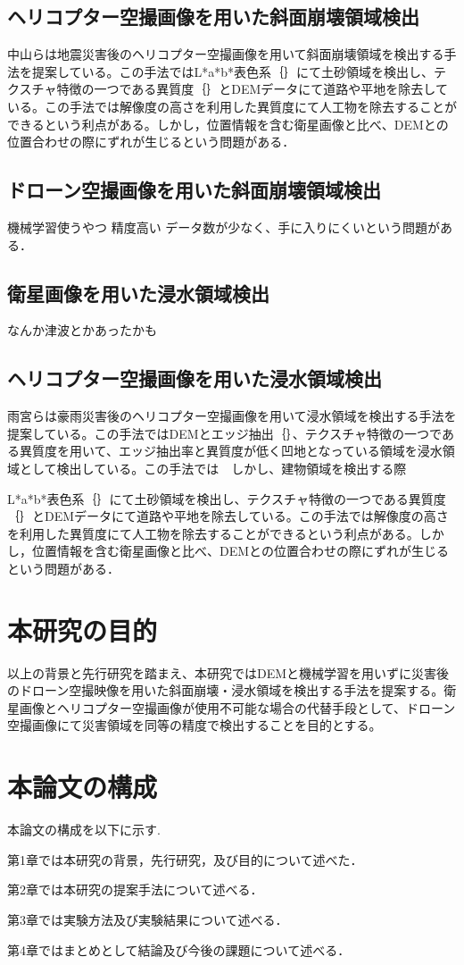 \documentclass[../Thesis]{subfiles}
\begin{document}
\subsection{ヘリコプター空撮画像を用いた斜面崩壊領域検出}
  中山\cite{art02}らは地震災害後のヘリコプター空撮画像を用いて斜面崩壊領域を検出する手法を提案している。この手法ではL*a*b*表色系｛｝にて土砂領域を検出し、テクスチャ特徴の一つである異質度｛｝とDEMデータにて道路や平地を除去している。この手法では解像度の高さを利用した異質度にて人工物を除去することができるという利点がある。しかし，位置情報を含む衛星画像と比べ、DEMとの位置合わせの際にずれが生じるという問題がある．

\subsection{ドローン空撮画像を用いた斜面崩壊領域検出}
  機械学習使うやつ
  精度高い
  データ数が少なく、手に入りにくいという問題がある．

\subsection{衛星画像を用いた浸水領域検出}
  なんか津波とかあったかも

\subsection{ヘリコプター空撮画像を用いた浸水領域検出}
  雨宮\cite{art03}らは豪雨災害後のヘリコプター空撮画像を用いて浸水領域を検出する手法を提案している。この手法ではDEMとエッジ抽出｛｝、テクスチャ特徴の一つである異質度を用いて、エッジ抽出率と異質度が低く凹地となっている領域を浸水領域として検出している。この手法では　しかし、建物領域を検出する際

  L*a*b*表色系｛｝にて土砂領域を検出し、テクスチャ特徴の一つである異質度｛｝とDEMデータにて道路や平地を除去している。この手法では解像度の高さを利用した異質度にて人工物を除去することができるという利点がある。しかし，位置情報を含む衛星画像と比べ、DEMとの位置合わせの際にずれが生じるという問題がある．


\section{本研究の目的} 
  以上の背景と先行研究を踏まえ、本研究ではDEMと機械学習を用いずに災害後のドローン空撮映像を用いた斜面崩壊・浸水領域を検出する手法を提案する。衛星画像とヘリコプター空撮画像が使用不可能な場合の代替手段として、ドローン空撮画像にて災害領域を同等の精度で検出することを目的とする。


\section{本論文の構成}
  \label{sec:本論文の構成}
  本論文の構成を以下に示す. \par
  第1章では本研究の背景，先行研究，及び目的について述べた．\par
  第2章では本研究の提案手法について述べる．\par
  第3章では実験方法及び実験結果について述べる．\par
  第4章ではまとめとして結論及び今後の課題について述べる．
\end{document}
